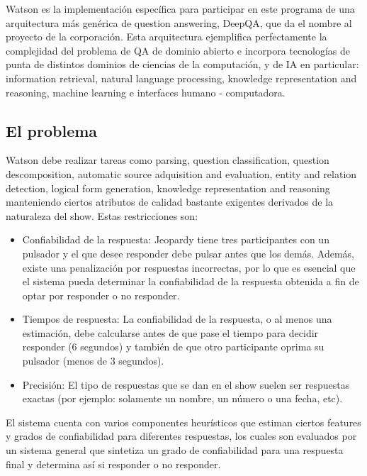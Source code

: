 Watson es la implementación específica para participar en este
programa de una arquitectura más genérica de question answering,
DeepQA, que da el nombre al proyecto de la corporación. Esta
arquitectura ejemplifica perfectamente la complejidad del problema de
QA de dominio abierto e incorpora tecnologías de punta de distintos
dominios de ciencias de la computación, y de IA en particular:
information retrieval, natural language processing, knowledge
representation and reasoning, machine learning e interfaces humano -
computadora.

\subsection{El problema}

Watson debe realizar tareas como parsing, question classification,
question descomposition, automatic source adquisition and evaluation,
entity and relation detection, logical form generation, knowledge
representation and reasoning manteniendo ciertos atributos de calidad
bastante exigentes derivados de la naturaleza del show. Estas
restricciones son:

\begin{itemize}
\item Confiabilidad de la respuesta: \newline
Jeopardy tiene tres participantes con un pulsador y el que desee
responder debe pulsar antes que los demás. Además, existe una
penalización por respuestas incorrectas, por lo que es esencial que
el sistema pueda determinar la confiabilidad de la respuesta obtenida a
fin de optar por responder o no responder.
\item Tiempos de respuesta: \newline
La confiabilidad de la respuesta, o al menos una estimación, debe
calcularse antes de que pase el tiempo para decidir responder (6
segundos) y también de que otro participante oprima su pulsador
(menos de 3 segundos).
\item Precisión:\newline
El tipo de respuestas que se dan en el show suelen ser respuestas
exactas (por ejemplo: solamente un nombre, un número o una fecha,
etc). 
\end{itemize}

\bigskip

El sistema cuenta con varios componentes heurísticos que estiman
ciertos features y grados de confiabilidad para diferentes respuestas,
los cuales son evaluados por un sistema general que sintetiza un grado
de confiabilidad para una respuesta final y determina así si
responder o no responder. 

